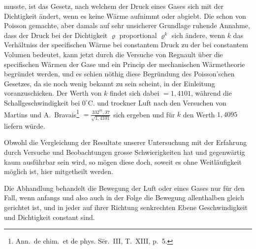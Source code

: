 \documentclass[12pt,a4paper]{book}
\theoremstyle{definition}
\theoremstyle{remark}
\begin{document}
musste, ist das Gesetz, nach welchem der Druck eines Gases sich mit der Dichtigkeit \"andert, wenn es keine W\"arme aufnimmt oder abgiebt. Die schon von Poisson gemachte, aber damals auf sehr unsicherer Grundlage ruhende Annahme, dass der Druck bei der Dichtigkeit $\varrho$ proportional $\varrho^{k}$ sich \"andere, wenn $k$ das Verh\"altniss der specifischen W\"arme bei constantem Druck zu der bei constantem Volumen bedeutet, kann jetzt durch die Versuche von Regnault \"uber die specifischen W\"armen der Gase und ein Princip der mechanischen W\"armetheorie begr\"undet werden, und es schien n\"othig diese Begr\"undung des Poisson'schen Gesetzes, da sie noch wenig bekannt zu sein scheint, in der Einleitung voranzuschicken. Der Werth von $k$ findet sich dabei $= 1{,}4101$, w\"ahrend die Schallgeschwindigkeit bei $0^{\circ}$C. und trockner Luft nach den Versuchen von Martins und A.~Bravais\footnote{Ann.~de chim.~et de phys. S\"er.~III, T.~XIII, p.~5.} $= \frac{332^{m},37}{\sqrt{1,4101}}$ sich ergeben und f\"ur $k$ den Werth $1{,}4095$ liefern w\"urde.

Obwohl die Vergleichung der Resultate unserer Untersuchung mit der Erfahrung durch Versuche und Beobachtungen grosse Schwierigkeiten hat und gegenw\"artig kaum ausf\"uhrbar sein wird, so m\"ogen diese doch, soweit es ohne Weitl\"aufigkeit m\"oglich ist, hier mitgetheilt werden.

Die Abhandlung behandelt die Bewegung der Luft oder eines Gases nur f\"ur den Fall, wenn anfangs und also auch in der Folge die Bewegung allenthalben gleich gerichtet ist, und in jeder auf ihrer Richtung senkrechten Ebene Geschwindigkeit und Dichtigkeit constant sind.
\end{document}
